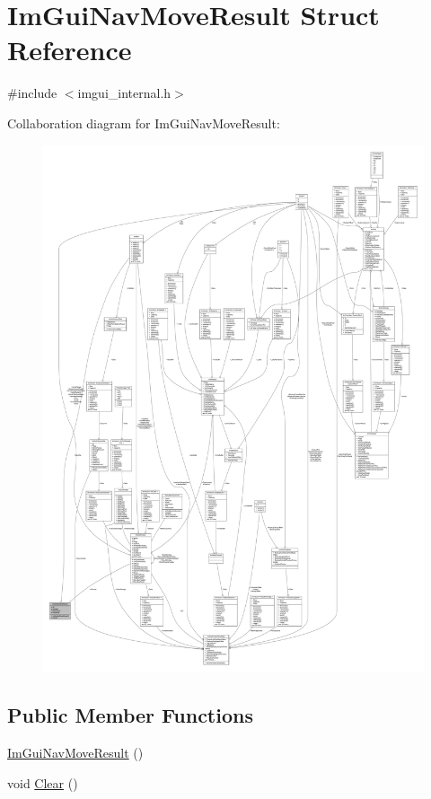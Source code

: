 \hypertarget{struct_im_gui_nav_move_result}{}\section{Im\+Gui\+Nav\+Move\+Result Struct Reference}
\label{struct_im_gui_nav_move_result}


{\ttfamily \#include $<$imgui\+\_\+internal.\+h$>$}



Collaboration diagram for Im\+Gui\+Nav\+Move\+Result\+:
\nopagebreak
\begin{figure}[H]
\begin{center}
\leavevmode
\includegraphics[width=350pt]{struct_im_gui_nav_move_result__coll__graph}
\end{center}
\end{figure}
\subsection*{Public Member Functions}
\begin{DoxyCompactItemize}
\item 
\mbox{\hyperlink{struct_im_gui_nav_move_result_a76bcc6d5bb813a8b9787bec50426cda2}{Im\+Gui\+Nav\+Move\+Result}} ()
\item 
void \mbox{\hyperlink{struct_im_gui_nav_move_result_a5a357bf3bc46689eebec0f6dfdfd51ca}{Clear}} ()
\end{DoxyCompactItemize}
